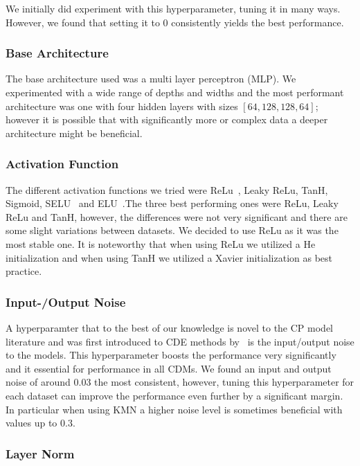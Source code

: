 We initially did experiment with this hyperparameter, tuning it in many ways. However, we found that setting it to $0$ consistently yields the best performance.

\subsubsection{Base Architecture}\label{sec:base_architecture}

The base architecture used was a multi layer perceptron (MLP). We experimented with a wide range of depths and widths and the most performant architecture was one with four hidden layers with sizes $[64, 128, 128, 64]$; however it is possible that with significantly more or complex data a deeper architecture might be beneficial.

\subsubsection{Activation Function}

The different activation functions we tried were ReLu~\cite{agarap2018deep}, Leaky ReLu, TanH, Sigmoid, SELU~\cite{klambauer2017self} and ELU~\cite{clevert2015fast}.\@ The three best performing ones were ReLu, Leaky ReLu and TanH, however, the differences were not very significant and there are some slight variations between datasets. We decided to use ReLu as it was the most stable one. It is noteworthy that when using ReLu we utilized a He initialization and when using TanH we utilized a Xavier initialization as best practice.

\subsubsection{Input-/Output Noise}

A hyperparamter that to the best of our knowledge is novel to the CP model literature and was first introduced to CDE methods by~\cite{rothfuss2019noise} is the input/output noise to the models. This hyperparameter boosts the performance very significantly and it essential for performance in all CDMs. We found an input and output noise of around $0.03$ the most consistent, however, tuning this hyperparameter for each dataset can improve the performance even further by a significant margin. In particular when using KMN a higher noise level is sometimes beneficial with values up to $0.3$.

\subsubsection{Layer Norm}

